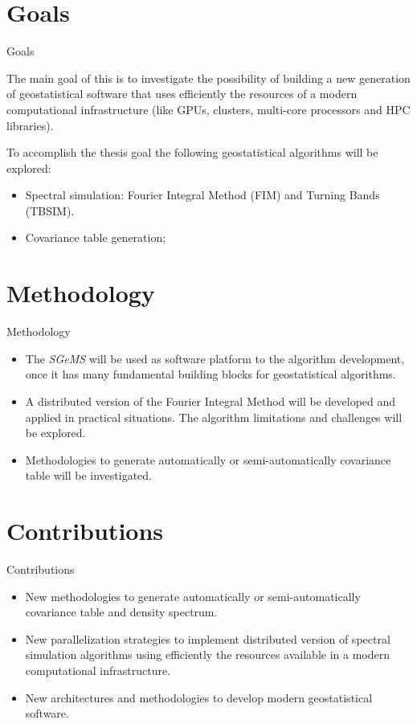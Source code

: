 \section{Goals}
\begin{frame}{Goals}

The main goal of this is to investigate the possibility of building a new generation of geostatistical software that uses efficiently the resources of a modern computational infrastructure (like GPUs, clusters, multi-core processors and HPC libraries).

To accomplish the thesis goal the following geostatistical algorithms will be explored:

\begin{itemize}
	\item Spectral simulation: Fourier Integral Method (FIM) and Turning Bands (TBSIM).
    \item Covariance table generation;
\end{itemize}
\end{frame}


\section{Methodology}
\begin{frame}{Methodology}
	\begin{itemize}
		\item The \textit{SGeMS} \cite{remy2009applied} will be used as software platform to the algorithm development, once it has many fundamental building blocks for geostatistical algorithms.
        \item A distributed version of the Fourier Integral Method will be developed and applied in practical situations. The algorithm limitations and challenges will be explored.
        \item Methodologies to generate automatically or semi-automatically covariance table will be investigated.
	\end{itemize}
\end{frame}

\section{Contributions}
\begin{frame}{Contributions}
	\begin{itemize}
        \item New methodologies to generate automatically or semi-automatically covariance table and density spectrum.
    	\item New parallelization strategies to implement distributed version of spectral simulation algorithms using efficiently the resources available in a modern computational infrastructure.
        \item New architectures and methodologies to develop modern geostatistical software. 
    \end{itemize}
\end{frame}

